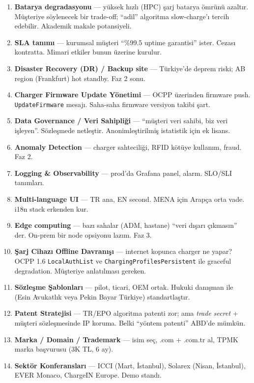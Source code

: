 \documentclass[11pt,a4paper]{article}
\begin{document}
\begin{enumerate}
    \item \textbf{Batarya degradasyonu} --- yüksek hızlı (HPC) şarj batarya ömrünü azaltır. Müşteriye söylenecek bir trade-off; ``adil'' algoritma slow-charge'ı tercih edebilir. Akademik makale potansiyeli.
    \item \textbf{SLA tanımı} --- kurumsal müşteri ``\%99.5 uptime garantisi'' ister. Cezası kontratta. Mimari etkiler bunun üzerine kurulur.
    \item \textbf{Disaster Recovery (DR) / Backup site} --- Türkiye'de deprem riski; AB region (Frankfurt) hot standby. Faz 2 sonu.
    \item \textbf{Charger Firmware Update Yönetimi} --- OCPP üzerinden firmware push. \texttt{UpdateFirmware} mesajı. Saha-saha firmware versiyon takibi şart.
    \item \textbf{Data Governance / Veri Sahipliği} --- ``müşteri veri sahibi, biz veri işleyen''. Sözleşmede netleştir. Anonimleştirilmiş istatistik için ek lisans.
    \item \textbf{Anomaly Detection} --- charger sahteciliği, RFID kötüye kullanım, fraud. Faz 2.
    \item \textbf{Logging \& Observability} --- prod'da Grafana panel, alarm. SLO/SLI tanımları.
    \item \textbf{Multi-language UI} --- TR ana, EN second. MENA için Arapça orta vade. i18n stack erkenden kur.
    \item \textbf{Edge computing} --- bazı sahalar (ADM, hastane) ``veri dışarı çıkmasın'' der. On-prem bir node opsiyonu lazım. Faz 3.
    \item \textbf{Şarj Cihazı Offline Davranışı} --- internet kopunca charger ne yapar? OCPP 1.6 \texttt{LocalAuthList} ve \texttt{ChargingProfilesPersistent} ile graceful degradation. Müşteriye anlatılması gereken.
    \item \textbf{Sözleşme Şablonları} --- pilot, ticari, OEM ortak. Hukuki danışman ile (Esin Avukatlık veya Pekin Bayar Türkiye) standartlaştır.
    \item \textbf{Patent Stratejisi} --- TR/EPO algoritma patenti zor; ama \textit{trade secret} + müşteri sözleşmesinde IP koruma. Belki ``yöntem patenti'' ABD'de mümkün.
    \item \textbf{Marka / Domain / Trademark} --- isim seç, .com + .com.tr al, TPMK marka başvurusu (3K TL, 6 ay).
    \item \textbf{Sektör Konferansları} --- ICCI (Mart, İstanbul), Solarex (Nisan, İstanbul), EVER Monaco, ChargeIN Europe. Demo standı.

\end{enumerate}
\end{document}
